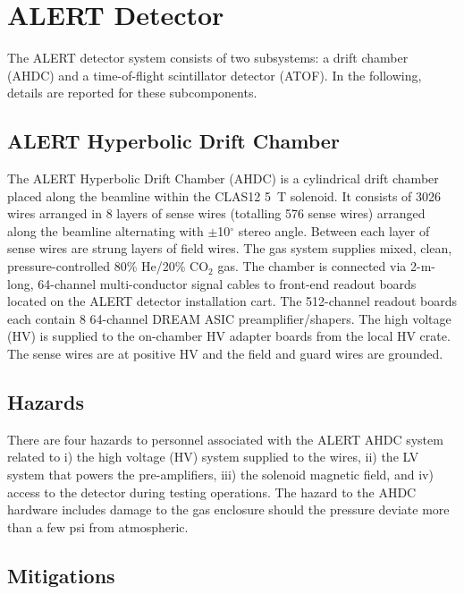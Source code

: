 \section{ALERT Detector}

The ALERT detector system consists of two subsystems: a drift chamber (AHDC) and a time-of-flight
scintillator detector (ATOF). In the following, details are reported for these subcomponents.

\subsection{ALERT Hyperbolic Drift Chamber}

The ALERT Hyperbolic Drift Chamber (AHDC) is a cylindrical drift chamber placed along the beamline
within the CLAS12 5~T solenoid. It consists of 3026 wires arranged in 8 layers of sense wires (totalling
576 sense wires) arranged along the beamline alternating with $\pm$10$^\circ$ stereo angle. Between
each layer of sense wires are strung layers of field wires. The gas system supplies mixed, clean,
pressure-controlled 80\% He/20\% CO$_2$ gas. The chamber is connected via 2-m-long, 64-channel
multi-conductor signal cables to front-end readout boards located on the ALERT detector installation
cart. The 512-channel readout boards each contain 8 64-channel DREAM ASIC preamplifier/shapers. The
high voltage (HV) is supplied to the on-chamber HV adapter boards from the local HV crate. The sense
wires are at positive HV and the field and guard wires are grounded.

\subsection{Hazards} 

There are four hazards to personnel associated with the ALERT AHDC system related to i) the high
voltage (HV) system supplied to the wires, ii) the LV system that powers the pre-amplifiers,
iii) the solenoid magnetic field, and iv) access to the detector during testing operations. The
hazard to the AHDC hardware includes damage to the gas enclosure should the pressure deviate more
than a few psi from atmospheric. 

\subsection{Mitigations}

